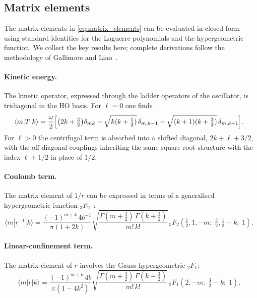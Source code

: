 \subsection{Matrix elements}
\label{ssec:matrix_elements}

The matrix elements in \cref{eq:matrix_elements} can be evaluated in closed
form using standard identities for the Laguerre polynomials and the
hypergeometric function. We collect the key results here; complete derivations
follow the methodology of Gallimore and Liao~\cite{gallimore2023}.

\paragraph{Kinetic energy.}
The kinetic operator, expressed through the ladder operators of the
oscillator, is tridiagonal in the HO basis. For $\ell=0$ one finds
\begin{equation}
  \label{eq:kinetic_matrix}
  \langle m | T | k \rangle = \frac{\omega}{2}\Bigl[
    \bigl(2k + \tfrac{3}{2}\bigr)\delta_{mk}
    -\sqrt{k(k+\tfrac{1}{2})}\,\delta_{m,k-1}
    -\sqrt{(k+1)(k+\tfrac{3}{2})}\,\delta_{m,k+1}
  \Bigr].
\end{equation}
For $\ell>0$ the centrifugal term is absorbed into a shifted diagonal,
$2k + \ell + 3/2$, with the off-diagonal couplings inheriting the same
square-root structure with the index $\ell + 1/2$ in place of $1/2$.

\paragraph{Coulomb term.}
The matrix element of $1/r$ can be expressed in terms of a generalised
hypergeometric function ${}_3F_2$~\cite{gallimore2023}:
\begin{equation}
  \label{eq:coulomb_matrix}
  \langle m | r^{-1} | k \rangle =
    \frac{(-1)^{m+k}\,4 b^{-1}}{\pi (1 + 2k)}
    \sqrt{\frac{\Gamma(m+\tfrac{3}{2})\,\Gamma(k+\tfrac{3}{2})}{m!\,k!}}\,
    {}_3F_2\!\left(\tfrac{1}{2},1,-m;\;\tfrac{3}{2},\tfrac{1}{2}-k;\;1\right).
\end{equation}

\paragraph{Linear-confinement term.}
The matrix element of $r$ involves the Gauss hypergeometric ${}_2F_1$:
\begin{equation}
  \label{eq:linear_matrix}
  \langle m | r | k \rangle =
    \frac{(-1)^{m+k}\,4 b}{\pi (1 - 4k^{2})}
    \sqrt{\frac{\Gamma(m+\tfrac{3}{2})\,\Gamma(k+\tfrac{3}{2})}{m!\,k!}}\,
    {}_2F_1\!\left(2,-m;\;\tfrac{3}{2}-k;\;1\right).
\end{equation}

